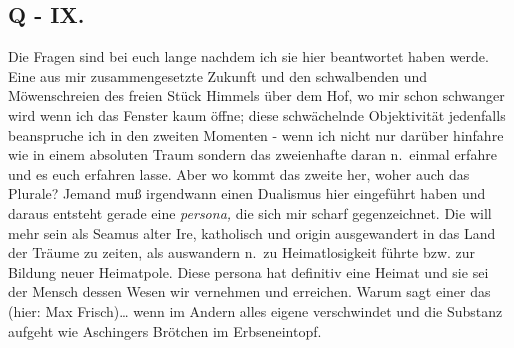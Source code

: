 \documentclass[
]{article}
\author{}
\date{\vspace{-2.5em}}
\begin{document}
\subsection{Q - IX.}\label{q---ix.}

Die Fragen sind bei euch lange nachdem ich sie hier beantwortet haben
werde. Eine aus mir zusammengesetzte Zukunft und den schwalbenden und
Möwenschreien des freien Stück Himmels über dem Hof, wo mir schon
schwanger wird wenn ich das Fenster kaum öffne; diese schwächelnde
Objektivität jedenfalls beanspruche ich in den zweiten Momenten - wenn
ich nicht nur darüber hinfahre wie in einem absoluten Traum sondern das
zweienhafte daran n.~einmal erfahre und es euch erfahren lasse. Aber wo
kommt das zweite her, woher auch das Plurale? Jemand muß irgendwann
einen Dualismus hier eingeführt haben und daraus entsteht gerade eine
\emph{persona,} die sich mir scharf gegenzeichnet. Die will mehr sein
als Seamus alter Ire, katholisch und origin ausgewandert in das Land der
Träume zu zeiten, als auswandern n.~zu Heimatlosigkeit führte bzw. zur
Bildung neuer Heimatpole. Diese persona hat definitiv eine Heimat und
sie sei der Mensch dessen Wesen wir vernehmen und erreichen. Warum sagt
einer das (hier: Max Frisch)\ldots{} wenn im Andern alles eigene
verschwindet und die Substanz aufgeht wie Aschingers Brötchen im
Erbseneintopf.
\end{document}
